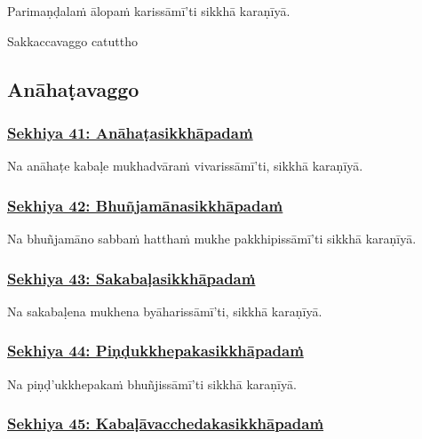 Parimaṇḍalaṁ ālopaṁ karissāmī'ti sikkhā karaṇīyā.

\begin{center}
	Sakkaccavaggo catuttho
\end{center}



\subsection{Anāhaṭavaggo}

\subsubsection*{\hyperref[training41]{Sekhiya 41: Anāhaṭasikkhāpadaṁ}}
\label{sekh41}

Na anāhaṭe kabaḷe mukhadvāraṁ vivarissāmī'ti, sikkhā karaṇīyā.



\subsubsection*{\hyperref[training42]{Sekhiya 42: Bhuñjamānasikkhāpadaṁ}}
\label{sekh42}

Na bhuñjamāno sabbaṁ hatthaṁ mukhe pakkhipissāmī'ti sikkhā karaṇīyā.



\subsubsection*{\hyperref[training43]{Sekhiya 43: Sakabaḷasikkhāpadaṁ}}
\label{sekh43}

Na sakabaḷena mukhena byāharissāmī'ti, sikkhā karaṇīyā.



\subsubsection*{\hyperref[training44]{Sekhiya 44: Piṇḍukkhepakasikkhāpadaṁ}}
\label{sekh44}

Na piṇḍ'ukkhepakaṁ bhuñjissāmī'ti sikkhā karaṇīyā.



\subsubsection*{\hyperref[training45]{Sekhiya 45: Kabaḷāvacchedakasikkhāpadaṁ}}
\label{sekh45}

